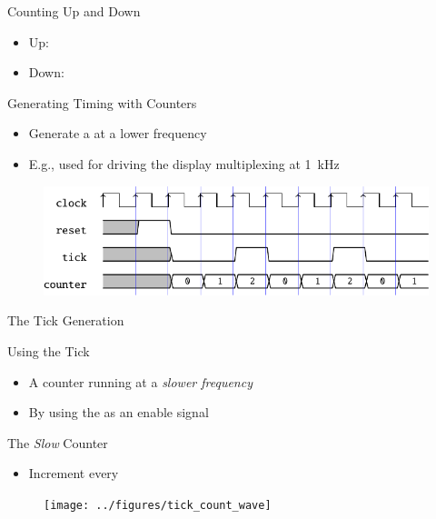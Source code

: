 \begin{frame}[fragile]{Counting Up and Down}
\begin{itemize}
\item Up:
\item Down:
\end{itemize}
\end{frame}



\begin{frame}[fragile]{Generating Timing with Counters}
\begin{itemize}
\item Generate a  at a lower frequency
\item E.g., used for driving the display multiplexing at 1~kHz
\end{itemize}
\begin{figure}
  \includegraphics[scale=0.8]{../figures/tick_wave}
\end{figure}
\end{frame}


\begin{frame}[fragile]{The Tick Generation}
\end{frame}

\begin{frame}[fragile]{Using the Tick}
\begin{itemize}
\item A counter running at a \emph{slower frequency}
\item By using the  as an enable signal
\end{itemize}
\end{frame}

\begin{frame}[fragile]{The \emph{Slow} Counter}
\begin{itemize}
\item Increment every 
\end{itemize}
\begin{figure}
  \texttt{[image: ../figures/tick\_count\_wave]}
\end{figure}
\end{frame}


